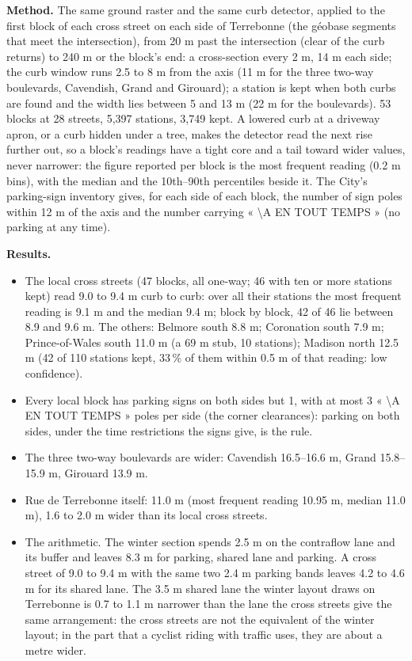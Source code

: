 \documentclass[11pt,a4paper]{article}
\begin{document}
\textbf{Method.} The same ground raster and the same curb detector, applied to the first block of each cross street on each side of Terrebonne (the géobase segments that meet the intersection), from 20 m past the intersection (clear of the curb returns) to 240 m or the block\textquoteright{}s end: a cross-section every 2 m, 14 m each side; the curb window runs 2.5 to 8 m from the axis (11 m for the three two-way boulevards, Cavendish, Grand and Girouard); a station is kept when both curbs are found and the width lies between 5 and 13 m (22 m for the boulevards). 53 blocks at 28 streets, 5,397 stations, 3,749 kept. A lowered curb at a driveway apron, or a curb hidden under a tree, makes the detector read the next rise further out, so a block\textquoteright{}s readings have a tight core and a tail toward wider values, never narrower: the figure reported per block is the most frequent reading (0.2 m bins), with the median and the 10th--90th percentiles beside it. The City\textquoteright{}s parking-sign inventory gives, for each side of each block, the number of sign poles within 12 m of the axis and the number carrying « \textbackslash{}A EN TOUT TEMPS » (no parking at any time).

\textbf{Results.}
\begin{itemize}
\item The local cross streets (47 blocks, all one-way; 46 with ten or more stations kept) read 9.0 to 9.4 m curb to curb: over all their stations the most frequent reading is 9.1 m and the median 9.4 m; block by block, 42 of 46 lie between 8.9 and 9.6 m. The others: Belmore south 8.8 m; Coronation south 7.9 m; Prince-of-Wales south 11.0 m (a 69 m stub, 10 stations); Madison north 12.5 m (42 of 110 stations kept, 33\,\% of them within 0.5 m of that reading: low confidence).
\item Every local block has parking signs on both sides but 1, with at most 3 « \textbackslash{}A EN TOUT TEMPS » poles per side (the corner clearances): parking on both sides, under the time restrictions the signs give, is the rule.
\item The three two-way boulevards are wider: Cavendish 16.5--16.6 m, Grand 15.8--15.9 m, Girouard 13.9 m.
\item Rue de Terrebonne itself: 11.0 m (most frequent reading 10.95 m, median 11.0 m), 1.6 to 2.0 m wider than its local cross streets.
\item The arithmetic. The winter section spends 2.5 m on the contraflow lane and its buffer and leaves 8.3 m for parking, shared lane and parking. A cross street of 9.0 to 9.4 m with the same two 2.4 m parking bands leaves 4.2 to 4.6 m for its shared lane. The 3.5 m shared lane the winter layout draws on Terrebonne is 0.7 to 1.1 m narrower than the lane the cross streets give the same arrangement: the cross streets are not the equivalent of the winter layout; in the part that a cyclist riding with traffic uses, they are about a metre wider.
\end{itemize}
\end{document}
